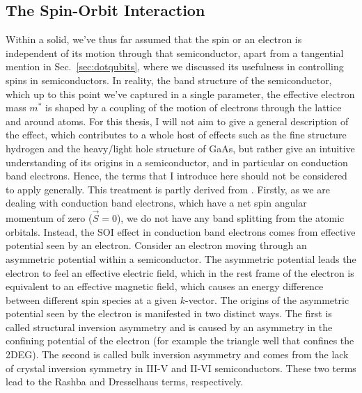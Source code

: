 \subsection{The Spin-Orbit Interaction}
\label{sec:SOI}
Within a solid, we've thus far assumed that the spin or an electron is independent of its motion through that semiconductor, apart from
a tangential mention in Sec.~\ref{sec:dotqubits}, where we discussed its usefulness in controlling spins in semiconductors. In reality, the
band structure of the semiconductor, which up to this point we've captured in a single parameter, the effective electron mass $m^*$ is shaped
by a coupling of the motion of electrons through the lattice and around atoms. For this thesis, I will not aim to give a general description of
the effect, which contributes to a whole host of effects such as the fine structure hydrogen and the heavy/light hole structure of GaAs,
but rather give an intuitive understanding of its origins in a semiconductor, and in particular on conduction band electrons. Hence, the terms that
I introduce here should not be considered to apply generally. This treatment is partly derived from \cite{winkler2003spin,dyakonov2017spin}.
Firstly, as we are dealing with conduction band electrons, which have a net spin angular momentum of
zero ($\vec S = 0$), we do not have any band splitting from the atomic orbitals. Instead, the SOI effect in conduction band electrons comes from effective
potential seen by an electron. Consider an electron moving through an asymmetric potential within a semiconductor. The asymmetric potential leads the
electron to feel an effective electric field, which in the rest frame of the electron is equivalent to an effective magnetic field, which causes an energy difference
between different spin species at a given $k$-vector. The origins of the asymmetric potential seen by the electron is manifested in two distinct ways. The first is called structural inversion asymmetry and is caused by an asymmetry in the confining potential of the electron (for example the triangle well that confines the 2DEG). The second is called bulk inversion asymmetry and comes from the lack of crystal inversion symmetry in III-V and II-VI semiconductors. These two terms lead to the Rashba and Dresselhaus terms, respectively.

